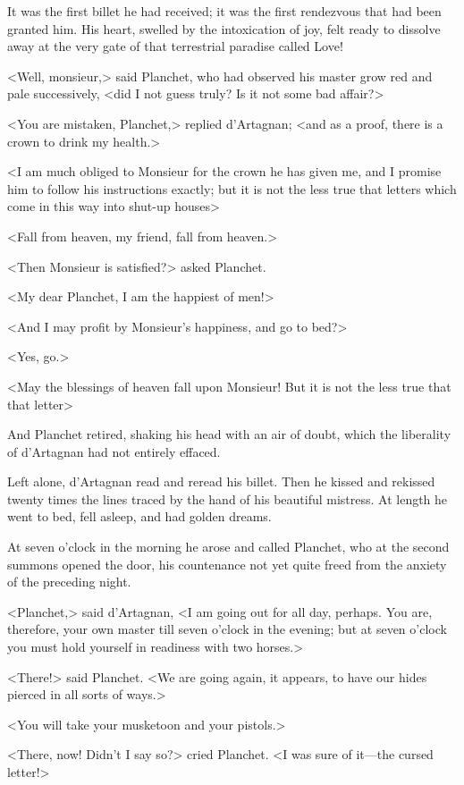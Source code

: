 It was the first billet he had received; it was the first rendezvous that had been granted him. His heart, swelled by the intoxication of joy, felt ready to dissolve away at the very gate of that terrestrial paradise called Love! 

<Well, monsieur,> said Planchet, who had observed his master grow red and pale successively, <did I not guess truly? Is it not some bad affair?> 

<You are mistaken, Planchet,> replied d'Artagnan; <and as a proof, there is a crown to drink my health.> 

<I am much obliged to Monsieur for the crown he has given me, and I promise him to follow his instructions exactly; but it is not the less true that letters which come in this way into shut-up houses\longdash> 

<Fall from heaven, my friend, fall from heaven.> 

<Then Monsieur is satisfied?> asked Planchet. 

<My dear Planchet, I am the happiest of men!> 

<And I may profit by Monsieur's happiness, and go to bed?> 

<Yes, go.> 

<May the blessings of heaven fall upon Monsieur! But it is not the less true that that letter\longdash> 

And Planchet retired, shaking his head with an air of doubt, which the liberality of d'Artagnan had not entirely effaced. 

Left alone, d'Artagnan read and reread his billet. Then he kissed and rekissed twenty times the lines traced by the hand of his beautiful mistress. At length he went to bed, fell asleep, and had golden dreams. 

At seven o'clock in the morning he arose and called Planchet, who at the second summons opened the door, his countenance not yet quite freed from the anxiety of the preceding night. 

<Planchet,> said d'Artagnan, <I am going out for all day, perhaps. You are, therefore, your own master till seven o'clock in the evening; but at seven o'clock you must hold yourself in readiness with two horses.> 

<There!> said Planchet. <We are going again, it appears, to have our hides pierced in all sorts of ways.> 

<You will take your musketoon and your pistols.> 

<There, now! Didn't I say so?> cried Planchet. <I was sure of it---the cursed letter!> 

